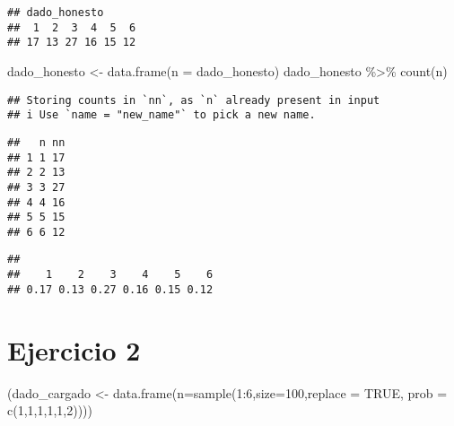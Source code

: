 \documentclass[
]{article}
\newenvironment{Shaded}{\begin{snugshade}}{\end{snugshade}}
\newcommand{\AttributeTok}[1]{\textcolor[rgb]{0.77,0.63,0.00}{#1}}
\newcommand{\CommentTok}[1]{\textcolor[rgb]{0.56,0.35,0.01}{\textit{#1}}}
\newcommand{\ConstantTok}[1]{\textcolor[rgb]{0.00,0.00,0.00}{#1}}
\newcommand{\DecValTok}[1]{\textcolor[rgb]{0.00,0.00,0.81}{#1}}
\newcommand{\FunctionTok}[1]{\textcolor[rgb]{0.00,0.00,0.00}{#1}}
\newcommand{\NormalTok}[1]{#1}
\newcommand{\OtherTok}[1]{\textcolor[rgb]{0.56,0.35,0.01}{#1}}
\newcommand{\SpecialCharTok}[1]{\textcolor[rgb]{0.00,0.00,0.00}{#1}}
\begin{document}
\begin{verbatim}
## dado_honesto
##  1  2  3  4  5  6 
## 17 13 27 16 15 12
\end{verbatim}

\begin{Shaded}
\begin{Highlighting}[]
\NormalTok{dado\_honesto }\OtherTok{\textless{}{-}} \FunctionTok{data.frame}\NormalTok{(}\AttributeTok{n =}\NormalTok{ dado\_honesto)}
\NormalTok{dado\_honesto }\SpecialCharTok{\%\textgreater{}\%}
  \FunctionTok{count}\NormalTok{(n)}
\end{Highlighting}
\end{Shaded}

\begin{verbatim}
## Storing counts in `nn`, as `n` already present in input
## i Use `name = "new_name"` to pick a new name.
\end{verbatim}

\begin{verbatim}
##   n nn
## 1 1 17
## 2 2 13
## 3 3 27
## 4 4 16
## 5 5 15
## 6 6 12
\end{verbatim}

\begin{Shaded}
\end{Shaded}

\begin{verbatim}
## 
##    1    2    3    4    5    6 
## 0.17 0.13 0.27 0.16 0.15 0.12
\end{verbatim}

\hypertarget{ejercicio-2}{%
\section{Ejercicio 2}\label{ejercicio-2}}

\begin{Shaded}
\begin{Highlighting}[]
\NormalTok{(dado\_cargado }\OtherTok{\textless{}{-}} \FunctionTok{data.frame}\NormalTok{(}\AttributeTok{n=}\FunctionTok{sample}\NormalTok{(}\DecValTok{1}\SpecialCharTok{:}\DecValTok{6}\NormalTok{,}\AttributeTok{size=}\DecValTok{100}\NormalTok{,}\AttributeTok{replace =} \ConstantTok{TRUE}\NormalTok{, }\AttributeTok{prob =} \FunctionTok{c}\NormalTok{(}\DecValTok{1}\NormalTok{,}\DecValTok{1}\NormalTok{,}\DecValTok{1}\NormalTok{,}\DecValTok{1}\NormalTok{,}\DecValTok{1}\NormalTok{,}\DecValTok{2}\NormalTok{))))}
\end{Highlighting}
\end{Shaded}
\end{document}
